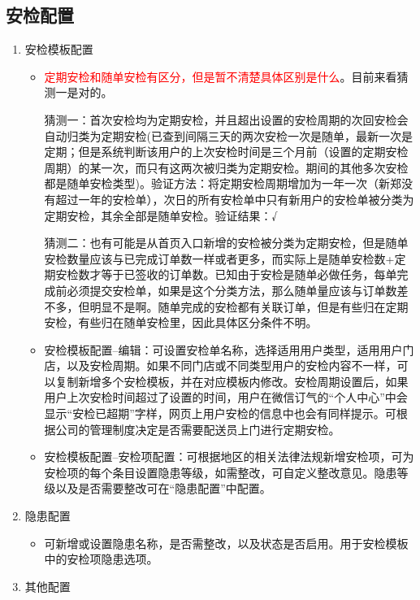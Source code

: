 \documentclass[UTF8]{ctexart}
\begin{document}
\subsection{安检配置}
\begin{enumerate}
	\item 安检模板配置
	
	\begin{itemize}
		

	\item \textcolor{red}{定期安检和随单安检有区分，但是暂不清楚具体区别是什么}。目前来看猜测一是对的。
	
	猜测一：首次安检均为定期安检，并且超出设置的安检周期的次回安检会自动归类为定期安检(已查到间隔三天的两次安检一次是随单，最新一次是定期；但是系统判断该用户的上次安检时间是三个月前（设置的定期安检周期）的某一次，而只有这两次被归类为定期安检。期间的其他多次安检都是随单安检类型)。验证方法：将定期安检周期增加为一年一次（新郑没有超过一年的安检单），次日的所有安检单中只有新用户的安检单被分类为定期安检，其余全部是随单安检。验证结果：√
	
	猜测二：也有可能是从首页入口新增的安检被分类为定期安检，但是随单安检数量应该与已完成订单数一样或者更多，而实际上是随单安检数+定期安检数才等于已签收的订单数。已知由于安检是随单必做任务，每单完成前必须提交安检单，如果是这个分类方法，那么随单量应该与订单数差不多，但明显不是啊。随单完成的安检都有关联订单，但是有些归在定期安检，有些归在随单安检里，因此具体区分条件不明。
	
	\item 安检模板配置--编辑：可设置安检单名称，选择适用用户类型，适用用户门店，以及安检周期。如果不同门店或不同类型用户的安检内容不一样，可以复制新增多个安检模板，并在对应模板内修改。安检周期设置后，如果用户上次安检时间超过了设置的时间，用户在微信订气的“个人中心”中会显示“安检已超期”字样，网页上用户安检的信息中也会有同样提示。可根据公司的管理制度决定是否需要配送员上门进行定期安检。
	
    \item 安检模板配置--安检项配置：可根据地区的相关法律法规新增安检项，可为安检项的每个条目设置隐患等级，如需整改，可自定义整改意见。隐患等级以及是否需要整改可在“隐患配置”中配置。
	
	\end{itemize}
	
	\item 隐患配置
	\begin{itemize}
		\item 
	
	可新增或设置隐患名称，是否需整改，以及状态是否启用。用于安检模板中的安检项隐患选项。
	\end{itemize}
	\item 其他配置
	

\end{enumerate}
\end{document}
